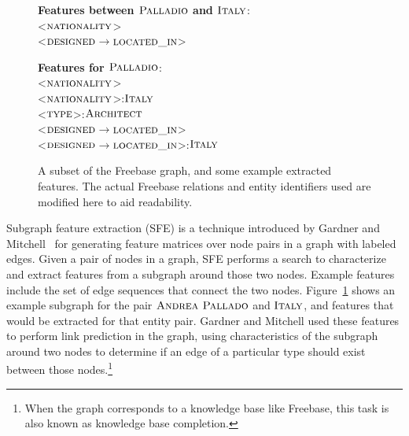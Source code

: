 \documentclass[11pt]{article}
\newcommand{\figref}[1]{Figure~\ref{fig:#1}}
\newcommand{\formalpredicate}[1]{\ensuremath{\textsc{#1}}}
\newcommand{\entity}[1]{\ensuremath{\textsc{#1}}}
\begin{document}
\begin{figure}
  {\center
  }
  \textbf{Features between \entity{Palladio} and \entity{Italy}}:\\
  \textless\formalpredicate{nationality}\textgreater\\
  \textless\formalpredicate{designed}$\rightarrow$\formalpredicate{located\_in}\textgreater

  \textbf{Features for \entity{Palladio}}:\\
  \textless\formalpredicate{nationality}\textgreater\\
  \textless\formalpredicate{nationality}\textgreater:\entity{Italy}\\
  \textless\formalpredicate{type}\textgreater:\entity{Architect}\\
  \textless\formalpredicate{designed}$\rightarrow$\formalpredicate{located\_in}\textgreater \\
  \textless\formalpredicate{designed}$\rightarrow$\formalpredicate{located\_in}\textgreater:\entity{Italy}

  \caption{A subset of the Freebase graph, and some example extracted
  features.  The actual Freebase relations and entity identifiers used
  are modified here to aid readability.}
  \label{fig:sfe}
\end{figure}

Subgraph feature extraction (SFE) is a technique introduced by Gardner
and Mitchell~ for generating feature
matrices over node pairs in a graph with labeled edges.  Given a pair
of nodes in a graph, SFE performs a search to characterize and extract
features from a subgraph around those two nodes.  Example features
include the set of edge sequences that connect the two nodes.
\figref{sfe} shows an example subgraph for the pair \entity{Andrea
Pallado} and \entity{Italy}, and features that would be extracted for
that entity pair.  Gardner and Mitchell used these features to perform
link prediction in the graph, using characteristics of the subgraph
around two nodes to determine if an edge of a particular type should
exist between those nodes.\footnote{When the graph corresponds to a
knowledge base like Freebase, this task is also known as knowledge
base completion.}
\end{document}
